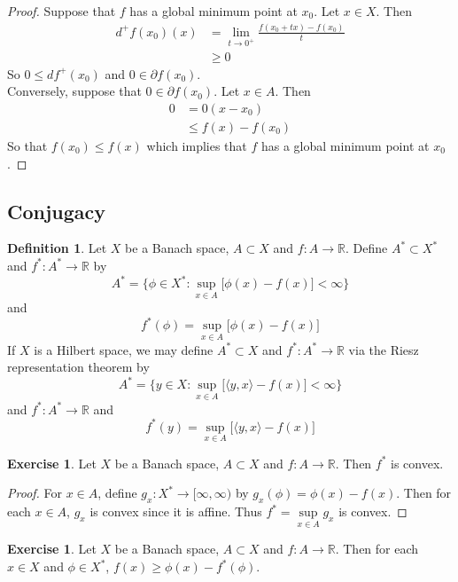 \documentclass[12pt]{amsart}
\theoremstyle{definition}
\newtheorem{defn}[definition]{Definition}
\newtheorem{ex}[definition]{Exercise}
\newcommand{\R}{\mathbb{R}}
\newcommand{\p}{\partial}
\renewcommand{\r}{\rangle}
\renewcommand{\l}{\langle}
\newcommand{\Rd}{[\infty, \infty)}
\begin{document}
	\begin{proof}
	Suppose that $f$ has a global minimum point at $x_0$. Let $x \in X$. Then 
	\begin{align*}
	d^+f(x_0)(x) 
	&= \lim_{t \rightarrow 0^+} \frac{f(x_0 + tx) - f(x_0)}{t} \\
	& \geq 0
	\end{align*}
	So $0 \leq df^+(x_0)$ and $0 \in \p f(x_0)$.\\
	Conversely, suppose that $0 \in \p f(x_0)$. Let $x \in A$. Then 
	\begin{align*}
	0
	& = 0(x - x_0) \\
	& \leq f(x) - f(x_0)
	\end{align*}
	So that $f(x_0) \leq f(x)$ which implies that $f$ has a global minimum point at $x_0$.
	\end{proof}
	
	
	
	\newpage 
	\subsection{Conjugacy}
	
	\begin{defn}
	Let $X$ be a Banach space, $A \subset X$ and $f:A \rightarrow \R$. Define $A^* \subset X^*$ and $f^*: A^* \rightarrow \R$ by $$A^* = \bigg \{\phi \in X^*: \sup_{x \in A} \bigg[ \phi(x) - f(x) \bigg] < \infty \bigg  \}$$ and $$f^*(\phi) = \sup_{x \in A} \bigg[ \phi(x) - f(x) \bigg] $$ 
	If $X$ is a Hilbert space, we may define $A^* \subset X$ and $f^*: A^* \rightarrow \R$ via the Riesz representation theorem by $$A^* = \bigg \{y \in X: \sup_{x \in A} \bigg[ \l y, x \r - f(x) \bigg] < \infty \bigg  \}$$ and $f^*: A^* \rightarrow \R$ and $$ f^*(y) = \sup_{x \in A} \bigg[ \l y, x \r - f(x) \bigg] $$
	\end{defn} 
	
	\begin{ex}
	Let $X$ be a Banach space, $A \subset X$ and $f:A \rightarrow \R$. Then $f^*$ is convex. 
	\end{ex}
	
	\begin{proof}
		For $x \in A$, define $g_x: X^* \rightarrow \Rd$ by $g_x(\phi) = \phi(x) - f(x)$. Then for each $x \in A$, $g_x$ is convex since it is affine. Thus $f^* = \sup\limits_{x \in A} g_x$		 
is convex.  
	\end{proof}
	
	\begin{ex}
		Let $X$ be a Banach space, $A \subset X$ and $f:A \rightarrow \R$. Then for each $x \in X$ and $\phi \in X^*$, $f(x) \geq \phi(x) - f^*(\phi)$.	
	\end{ex}
	
\end{document}
